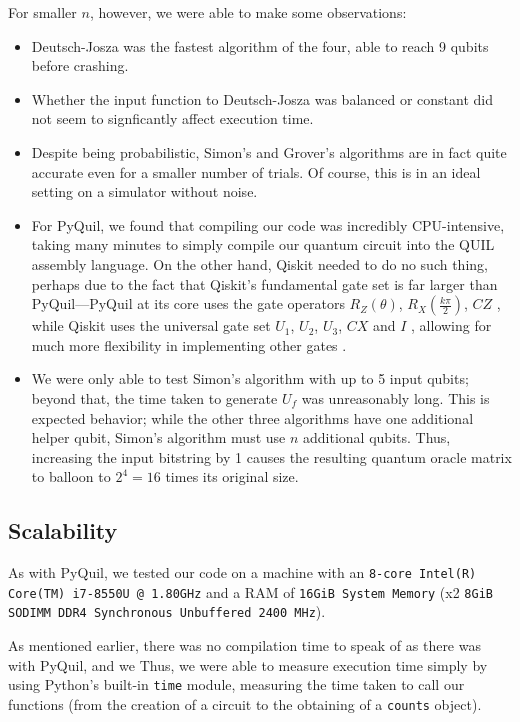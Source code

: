 \documentclass[12pt]{article}
\begin{document}
For smaller $n$, however, we were able to make some observations:

\begin{itemize}
    \item Deutsch-Josza was the fastest algorithm of the four, able to reach 9 qubits before crashing.
    \item Whether the input function to Deutsch-Josza was balanced or constant did not seem to signficantly affect execution time.
    \item Despite being probabilistic, Simon's and Grover's algorithms are in fact quite accurate even for a smaller number of trials. Of course, this is in an ideal setting on a simulator without noise.
    \item For PyQuil, we found that compiling our code was incredibly CPU-intensive, taking many minutes to simply compile our quantum circuit into the QUIL assembly language.
        On the other hand, Qiskit needed to do no such thing, perhaps due to the fact that Qiskit's fundamental gate set is far larger than PyQuil---PyQuil at its core uses the gate operators $R_Z(\theta)$, $R_X(\frac{k\pi}{2})$, $CZ$ \cite{rigetti}, while Qiskit uses the universal gate set $U_1$, $U_2$, $U_3$, $CX$ and $I$ \cite{gates}, allowing for much more flexibility in implementing other gates \cite{opt}.
    \item We were only able to test Simon's algorithm with up to 5 input qubits; beyond that, the time taken to generate $U_f$ was unreasonably long. This is expected behavior; while the other three algorithms have one additional helper qubit, Simon's algorithm must use $n$ additional qubits. Thus, increasing the input bitstring by 1 causes the resulting quantum oracle matrix to balloon to $2^4 = 16$ times its original size.
\end{itemize}

\subsection{Scalability}\label{section:scale}

As with PyQuil, we tested our code on a machine with an \texttt{8-core Intel(R) Core(TM) i7-8550U @ 1.80GHz} and a RAM of \texttt{16GiB System Memory} (x2 \texttt{8GiB SODIMM DDR4 Synchronous Unbuffered 2400 MHz}).

As mentioned earlier, there was no compilation time to speak of as there was with PyQuil, and we 
Thus, we were able to measure execution time simply by using Python's built-in \texttt{time} module, measuring the time taken to call our functions (from the creation of a circuit to the obtaining of a \texttt{counts} object).
\end{document}
